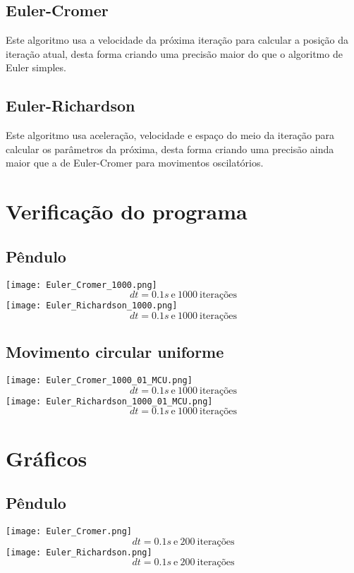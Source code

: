 \documentclass[a4paper, 12pt]{article}
\begin{document}
\subsection*{Euler-Cromer}
Este algoritmo usa a velocidade da próxima iteração para calcular a posição da iteração atual, desta forma criando uma precisão maior do que o algoritmo de Euler simples.

\subsection*{Euler-Richardson}
Este algoritmo usa aceleração, velocidade e espaço do meio da iteração para calcular os parâmetros da próxima, desta forma criando uma precisão ainda maior que a de Euler-Cromer para movimentos oscilatórios.

\section*{Verificação do programa}
\subsection*{Pêndulo}
\texttt{[image: Euler\_Cromer\_1000.png]} \\
$$dt=0.1s\ \text{e}\ 1000\ \text{iterações}$$
\texttt{[image: Euler\_Richardson\_1000.png]} \\
$$dt=0.1s\ \text{e}\ 1000\ \text{iterações}$$


\subsection*{Movimento circular uniforme}
\texttt{[image: Euler\_Cromer\_1000\_01\_MCU.png]} \\
$$dt=0.1s\ \text{e}\ 1000\ \text{iterações}$$
\texttt{[image: Euler\_Richardson\_1000\_01\_MCU.png]} \\
$$dt=0.1s\ \text{e}\ 1000\ \text{iterações}$$

\section*{Gráficos}
\subsection*{Pêndulo}
\texttt{[image: Euler\_Cromer.png]} \\
$$dt=0.1s\ \text{e}\ 200\ \text{iterações}$$
\texttt{[image: Euler\_Richardson.png]} \\
$$dt=0.1s\ \text{e}\ 200\ \text{iterações}$$
\end{document}
